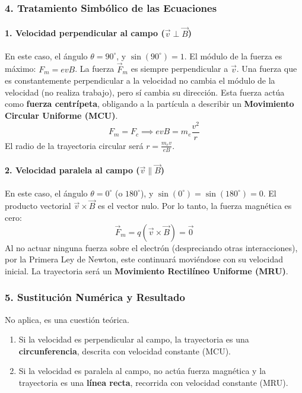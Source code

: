 \subsubsection*{4. Tratamiento Simbólico de las Ecuaciones}
\paragraph*{1. Velocidad perpendicular al campo ($\vec{v} \perp \vec{B}$)}
En este caso, el ángulo $\theta = 90^\circ$, y $\sin(90^\circ) = 1$. El módulo de la fuerza es máximo: $F_m = evB$.
La fuerza $\vec{F}_m$ es siempre perpendicular a $\vec{v}$. Una fuerza que es constantemente perpendicular a la velocidad no cambia el módulo de la velocidad (no realiza trabajo), pero sí cambia su dirección. Esta fuerza actúa como \textbf{fuerza centrípeta}, obligando a la partícula a describir un \textbf{Movimiento Circular Uniforme (MCU)}.
$$F_m = F_c \implies evB = m_e \frac{v^2}{r}$$
El radio de la trayectoria circular será $r = \frac{m_e v}{eB}$.

\paragraph*{2. Velocidad paralela al campo ($\vec{v} \parallel \vec{B}$)}
En este caso, el ángulo $\theta = 0^\circ$ (o $180^\circ$), y $\sin(0^\circ) = \sin(180^\circ) = 0$.
El producto vectorial $\vec{v} \times \vec{B}$ es el vector nulo. Por lo tanto, la fuerza magnética es cero:
$$\vec{F}_m = q(\vec{v} \times \vec{B}) = \vec{0}$$
Al no actuar ninguna fuerza sobre el electrón (despreciando otras interacciones), por la Primera Ley de Newton, este continuará moviéndose con su velocidad inicial. La trayectoria será un \textbf{Movimiento Rectilíneo Uniforme (MRU)}.

\subsubsection*{5. Sustitución Numérica y Resultado}
No aplica, es una cuestión teórica.
\begin{cajaresultado}
\begin{enumerate}
    \item Si la velocidad es perpendicular al campo, la trayectoria es una \textbf{circunferencia}, descrita con velocidad constante (MCU).
    \item Si la velocidad es paralela al campo, no actúa fuerza magnética y la trayectoria es una \textbf{línea recta}, recorrida con velocidad constante (MRU).
\end{enumerate}
\end{cajaresultado}

